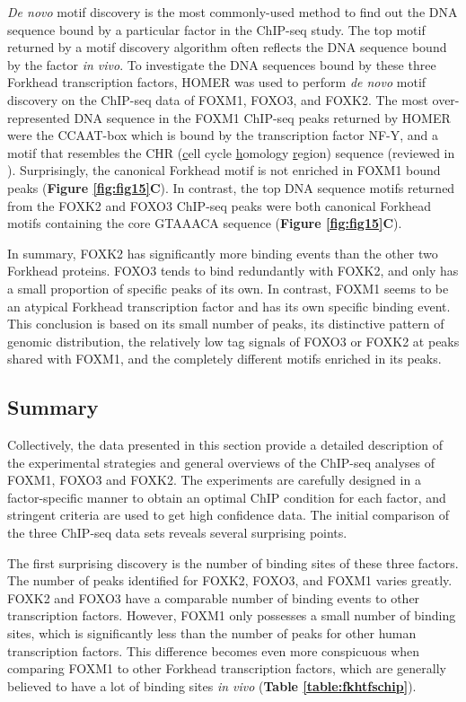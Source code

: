 \textit{De novo} motif discovery is the most commonly-used method to find out the DNA sequence bound by a particular factor in the ChIP-seq study. The top motif returned by a motif discovery algorithm often reflects the DNA sequence bound by the factor \textit{in vivo}. To investigate the DNA sequences bound by these three Forkhead transcription factors, HOMER was used to perform \textit{de novo} motif discovery on the ChIP-seq data of FOXM1, FOXO3, and FOXK2. The most over-represented DNA sequence in the FOXM1 ChIP-seq peaks returned by HOMER were the CCAAT-box which is bound by the transcription factor NF-Y, and a motif that resembles the CHR (\underline{c}ell cycle \underline{h}omology \underline{r}egion) sequence (reviewed in \cite{müller2010the}). Surprisingly, the canonical Forkhead motif is not enriched in FOXM1 bound peaks (\textbf{Figure \ref{fig:fig15}C}). In contrast, the top DNA sequence motifs returned from the FOXK2 and FOXO3 ChIP-seq peaks were both canonical Forkhead motifs containing the core GTAAACA sequence (\textbf{Figure \ref{fig:fig15}C}).

In summary, FOXK2 has significantly more binding events than the other two Forkhead proteins. FOXO3 tends to bind redundantly with FOXK2, and only has a small proportion of specific peaks of its own. In contrast, FOXM1 seems to be an atypical Forkhead transcription factor and has its own specific binding event. This conclusion is based on its small number of peaks, its distinctive pattern of genomic distribution, the relatively low tag signals of FOXO3 or FOXK2 at peaks shared with FOXM1, and the completely different motifs enriched in its peaks.

\subsection{Summary}

Collectively, the data presented in this section provide a detailed description of the experimental strategies and general overviews of the ChIP-seq analyses of FOXM1, FOXO3 and FOXK2. The experiments are carefully designed in a factor-specific manner to obtain an optimal ChIP condition for each factor, and stringent criteria are used to get high confidence data. The initial comparison of the three ChIP-seq data sets reveals several surprising points.

The first surprising discovery is the number of binding sites of these three factors. The number of peaks identified for FOXK2, FOXO3, and FOXM1 varies greatly. FOXK2 and FOXO3 have a comparable number of binding events to other transcription factors. However, FOXM1 only possesses a small number of binding sites, which is significantly less than the number of peaks for other human transcription factors. This difference becomes even more conspicuous when comparing FOXM1 to other Forkhead transcription factors, which are generally believed to have a lot of binding sites \textit{in vivo} (\textbf{Table \ref{table:fkhtfschip}}).

